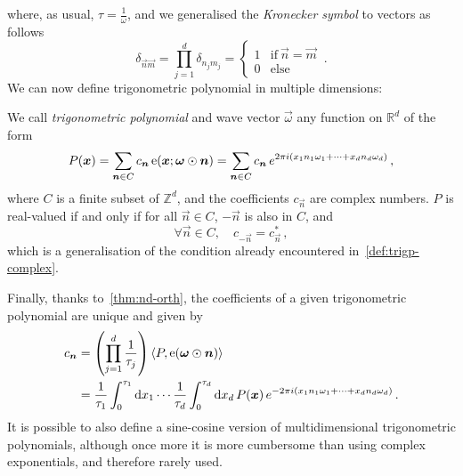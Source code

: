 where, as usual, $\tau=\frac{1}{\omega}$, and we generalised the \emph{Kronecker symbol}
to vectors as follows
\begin{equation}
  \label{eq:kronecker-vec}
  \delta_{\vec{n}\vec{m}}=\prod_{j=1}^{d}\delta_{n_jm_j}=
  \begin{cases}
    1&\text{if}~\vec{n}=\vec{m}\\
    0&\text{else}
  \end{cases}\,.
\end{equation}
We can now define trigonometric polynomial in multiple dimensions:
\begin{definition}
  We call \emph{trigonometric polynomial} and wave vector $\vec{\omega}$ any function on
  $\mathbb{R}^d$ of the form
  \begin{equation}
    P(\bm{x})=\sum_{\bm{n}\in C}c_{\bm{n}}\operatorname{e}(\bm{x};\bm{\omega}\odot\bm{n})
    =\sum_{\bm{n}\in C}c_{\bm{n}}\,e^{2\pi i(x_1n_1\omega_1+\cdots+x_dn_d\omega_d)}\,,
  \end{equation}
  where $C$ is a finite subset of $\mathbb{Z}^d$, and the coefficients $c_{\vec{n}}$ are
  complex numbers. $P$ is real-valued if and only if for all $\vec{n}\in C$, $-\vec{n}$ is
  also in $C$, and
  \begin{equation}
    \forall\vec{n}\in C,\quad c_{-\vec{n}}=c_{\vec{n}}^*\,,
  \end{equation}
  which is a generalisation of the condition already encountered
  in~\cref{def:trigp-complex}.
\end{definition}
Finally, thanks to~\cref{thm:nd-orth}, the coefficients of a given trigonometric
polynomial are unique and given by
\begin{align}
  c_{\bm{n}}&=\left(\prod_{j=1}^{d}\frac{1}{\tau_j}\right)
  \braket{P,\operatorname{e}(\bm{\omega}\odot\bm{n})}\notag\\
  &=
  \frac{1}{\tau_1}\int_0^{\tau_1}\mathrm{d} x_1\cdots\frac{1}{\tau_d}\int_0^{\tau_d}\mathrm{d} x_d\,
  P(\bm{x})\,e^{-2\pi i(x_1n_1\omega_1+\cdots+x_dn_d\omega_d)}\,.
\end{align}
It is possible to also define a sine-cosine version of multidimensional trigonometric
polynomials, although once more it is more cumbersome than using complex exponentials, and
therefore rarely used.
